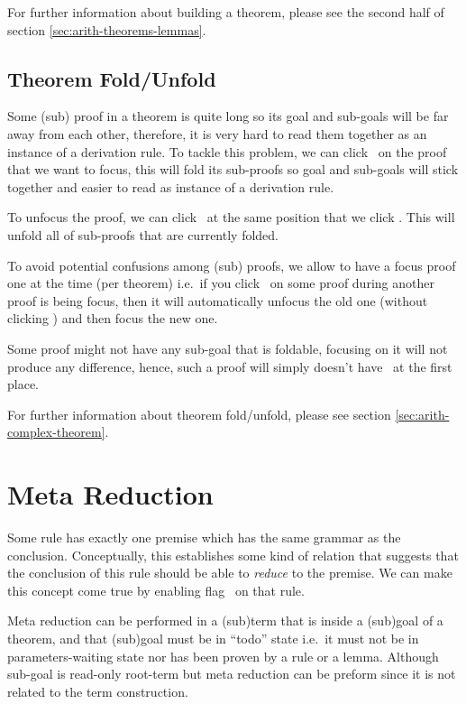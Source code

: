 \documentclass[master.tex]{subfiles}
\begin{document}
For further information about building a theorem, please see the second half of
section \ref{sec:arith-theorems-lemmas}.

\subsection{Theorem Fold/Unfold}

Some (sub) proof in a theorem is quite long so its goal and sub-goals will be
far away from each other, therefore, it is very hard to read them together as an
instance of a derivation rule. To tackle this problem, we can click
\focusButton\ on the proof that we want to focus, this will fold its sub-proofs
so goal and sub-goals will stick together and easier to read as instance of a
derivation rule.

To unfocus the proof, we can click \unfocusButton\ at the same position that we
click \focusButton. This will unfold all of sub-proofs that are currently
folded.

To avoid potential confusions among (sub) proofs, we allow to have a focus proof
one at the time (per theorem) i.e.\ if you click \focusButton\ on some proof
during another proof is being focus, then it will automatically unfocus the old
one (without clicking \unfocusButton) and then focus the new one.

Some proof might not have any sub-goal that is foldable, focusing on it will not
produce any difference, hence, such a proof will simply doesn't have
\focusButton\ at the first place.

For further information about theorem fold/unfold, please see section
\ref{sec:arith-complex-theorem}.

\section{Meta Reduction}

Some rule has exactly one premise which has the same grammar as the conclusion.
Conceptually, this establishes some kind of relation that suggests that the
conclusion of this rule should be able to \emph{reduce} to the premise. We can
make this concept come true by enabling flag \kAllowReduction\ on that rule.

Meta reduction can be performed in a (sub)term that is inside a (sub)goal of a
theorem, and that (sub)goal must be in ``todo'' state i.e.\ it must not be in
parameters-waiting state nor has been proven by a rule or a lemma. Although
sub-goal is read-only root-term but meta reduction can be preform since it is
not related to the term construction.
\end{document}
